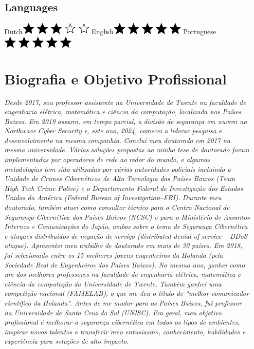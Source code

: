 \documentclass[print]{styles/friggeri-cv-mac} %
\begin{document}
\begin{aside}
\section{Languages}
Dutch\includegraphics[scale=0.40]{img/3stars.png}
English\includegraphics[scale=0.40]{img/5stars.png}
Portuguese\includegraphics[scale=0.40]{img/5stars.png}
\end{aside}

\section{Biografia e Objetivo Profissional}\vspace{-10pt}
\noindent\setlength\parindent{12pt}\textit{
Desde 2017, sou professor assistente na Universidade de Twente na faculdade de engenharia elétrica, matemática e ciência da computação, localizada nos Países Baixos. Em 2019 assumi, em tempo parcial, a divisão de segurança em nuvem na Northwave Cyber Security e, este ano, 2024, comecei a liderar pesquisa e desenvolvimento na mesma companhia. Concluí meu doutorado em 2017 na mesma universidade. 
%
Várias soluções propostas na minha tese de doutorado foram implementadas por operadores de rede ao redor do mundo, e algumas metodologias tem sido utilizadas por várias autoridades policiais incluindo a Unidade de Crimes Cibernéticos de Alta Tecnologia dos Países Baixos (\textit{Team High Tech Crime Police}) e o Departamento Federal de Investigação dos Estados Unidos da América (\textit{Federal Bureau of Investigation--FBI}). 
%
Durante meu doutorado, também atuei como consultor técnico para o Centro Nacional de Segurança Cibernética dos Países Baixos (NCSC) e para o Ministério de Assuntos Internos e Comunicações do Japão, ambos sobre o tema de Segurança Cibernética e ataques distribuidos de negação de serviço (\textit{distributed denial of service -- DDoS ataque}). Apresentei meu trabalho de doutorado em mais de 30 países.
%
Em 2018, fui selecionado entre os 15 melhores jovens engenheiros da Holanda (pela Sociedade Real de Engenheiros dos Países Baixos).
%
No mesmo ano, ganhei como um dos melhores professores na faculdade de engenharia elétrica, matemática e ciência da computação da Universidade de Twente. Também ganhei uma competição nacional (FAMELAB), o que me deu o título de ``melhor comunicador científico da Holanda''.
%
Antes de me mudar para os Países Baixos, fui professor na Universidade de Santa Cruz do Sul (UNISC).
%
Em geral, meu objetivo profissional é melhorar a segurança cibernética em todos os tipos de ambientes, inspirar novos talentos e transferir meu entusiasmo, conhecimento, habilidades e experiência para soluções de alto impacto.
}
\end{document}
